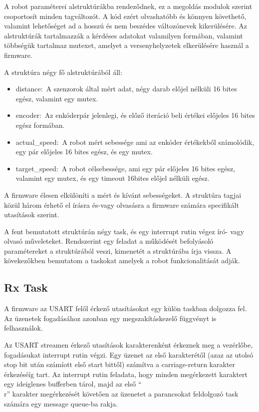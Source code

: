 A robot paraméterei alstruktúrákba rendeződnek, ez a megoldás modulok szerint
csoportosít minden tagváltozót. A kód ezért olvashatóbb és könnyen követhető,
valamint lehetőséget ad a hosszú és nem beszédes változónevek kikerülésére. Az
alstruktúrák tartalmazzák a kérdéses adatokat valamilyen formában, valamint
többségük tartalmaz mutexet, amelyet a versenyhelyzetek elkerülésére használ a
firmware.

A struktúra négy fő alstruktúrából áll:
\begin{itemize}
\item{distance:~A szenzorok által mért adat, négy darab előjel nélküli 16 bites
  egész, valamint egy mutex.}
\item{encoder:~Az enkóderpár jelenlegi, és előző iteráció beli értékei előjeles
  16 bites egész formában.}
\item{actual\_speed:~A robot mért sebessége ami az enkóder értékekből
  számolódik, egy pár előjeles 16 bites egész, és egy mutex.}
\item{target\_speed:~A robot célsebessége, ami egy pár előjeles 16 bites egész,
  valamint egy mutex, és egy timeout 16bites előjel nélküli egész.}
\end{itemize}

A firmware élesen elkülöníti a mért és kívánt sebességeket. A struktúra tagjai
közül három érhető el írásra és-vagy olvasásra a firmware számára specifikált
utasítások szerint.

\medskip

A fent bemutatott struktúrán négy task, és egy interrupt rutin végez író- vagy
olvasó műveleteket. Rendszerint egy feladat a működését befolyásoló paramétereket
a struktúrából veszi, kimenetét a struktúrába írja vissza. A kövekezőkben
bemutatom a taskokat amelyek a robot funkcionalitását adják.

\subsection{Rx Task}

A firmware az USART felől érkező utasításokat egy külön taskban dolgozza fel. Az
üzenetek fogadásához azonban egy megszakításkezelő függvényt is felhasználok.

Az USART streamen érkező utasítások karakterenként érkeznek meg a vezérlőbe,
fogadásukat interrupt rutin végzi. Egy üzenet az első karakterétől (azaz az
utolsó stop bit után számíott első start bittől) számítva a carriage-return
karakter érkezéséíg tart. Az interrupt rutin feladata, hogy minden megérkezett
karaktert egy ideiglenes bufferben tárol, majd az első ``\\r'' karakter
megérkezését követően az üzenetet a parancsokat feldolgozó task számára egy
message queue-ba rakja. 

